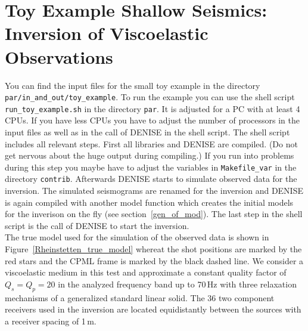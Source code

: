 % 


\section{Toy Example Shallow Seismics: Inversion of Viscoelastic Observations}
You can find the input files for the small toy example in the directory \texttt{par/in\_and\_out/toy\_example}. To run the example you can use the shell script \texttt{run\_toy\_example.sh} in the directory \texttt{par}. It is adjusted for a PC with at least 4 CPUs. If you have less CPUs you have to adjust the number of processors in the input files as well as in the call of DENISE in the shell script. The shell script includes all relevant steps. First all libraries and DENISE are compiled. (Do not get nervous about the huge output during compiling.) If you run into problems during this step you maybe have to adjust the variables in \texttt{Makefile\_var} in the directory \texttt{contrib}. Afterwards DENISE starts to simulate observed data for the inversion. The simulated seismograms are renamed for the inversion and DENISE is again compiled with another model function which creates the initial models for the inverison on the fly (see section~\ref{gen_of_mod}). The last step in the shell script is the call of DENISE to start the inversion.\\

The true model used for the simulation of the observed data is shown in Figure~\ref{Rheinstetten_true_model} whereat the shot positions are marked by the red stars and the CPML frame is marked by the black dashed line. We consider a viscoelastic medium in this test and approximate a constant quality factor of $Q_s=Q_p=20$ in the analyzed frequency band up to 70\,Hz with three relaxation mechanisms of a generalized standard linear solid. The 36 two component receivers used in the inversion are located equidistantly between the sources with a receiver spacing of 1\,m.\\

